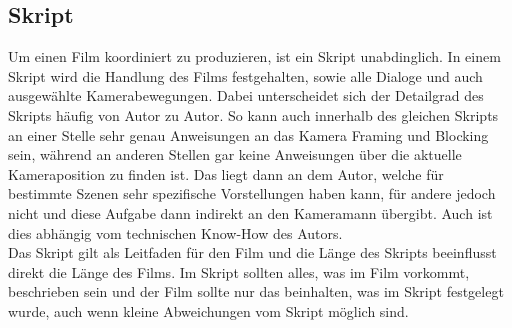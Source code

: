 \subsection{Skript}
Um einen Film koordiniert zu produzieren, ist ein Skript unabdinglich. In einem Skript wird die Handlung des Films festgehalten, sowie alle Dialoge und auch ausgewählte Kamerabewegungen. Dabei unterscheidet sich der Detailgrad des Skripts häufig von Autor zu Autor. So kann auch innerhalb des gleichen Skripts an einer Stelle sehr genau Anweisungen an das Kamera Framing und Blocking sein, während an anderen Stellen gar keine Anweisungen über die aktuelle Kameraposition zu finden ist. Das liegt dann an dem Autor, welche für bestimmte Szenen sehr spezifische Vorstellungen haben kann, für andere jedoch nicht und diese Aufgabe dann indirekt an den Kameramann übergibt. Auch ist dies abhängig vom technischen Know-How des Autors.\\
Das Skript gilt als Leitfaden für den Film und die Länge des Skripts beeinflusst direkt die Länge des Films. Im Skript sollten alles, was im Film vorkommt, beschrieben sein und der Film sollte nur das beinhalten, was im Skript festgelegt wurde, auch wenn kleine Abweichungen vom Skript möglich sind. 
